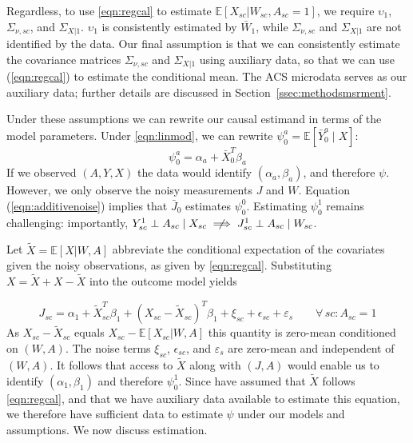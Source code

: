 \documentclass[aoas]{imsart}
\theoremstyle{plain}
\theoremstyle{remark}
\begin{document}
Regardless, to use \eqref{eqn:regcal} to estimate $\mathbb{E}[X_{sc}|W_{sc}, A_{sc}=1]$, we require $\upsilon_1$, $\Sigma_{\nu,sc}$, and $\Sigma_{X|1}$. $\upsilon_1$ is consistently estimated by $\bar{W}_1$, while $\Sigma_{\nu,sc}$ and $\Sigma_{X|1}$ are not identified by the data. Our final assumption is that we can consistently estimate the covariance matrices $\Sigma_{\nu,sc}$ and $\Sigma_{X|1}$ using auxiliary data, so that we can use (\ref{eqn:regcal}) to estimate the conditional mean. The ACS microdata serves as our auxiliary data; further details are discussed in Section~\ref{ssec:methodsmsrment}.

Under these assumptions we can rewrite our causal estimand in terms of the model parameters. Under \eqref{eqn:linmod}, we can rewrite $\psi_0^a = \mathbb{E}[\bar{Y}_0^a \mid X]$:
\begin{equation}\label{eqn:outcome}
\psi_0^a = \alpha_a + \bar{X}_0^T\beta_a
\end{equation}
If we observed $(A, Y, X)$ the data would identify $(\alpha_a, \beta_a)$, and therefore $\psi$. However, we only observe the noisy measurements $J$ and $W$. Equation (\ref{eqn:additivenoise}) implies that $\bar{J}_0$ estimates $\psi_0^0$. Estimating $\psi_0^1$ remains challenging: importantly, $Y_{sc}^1 \perp A_{sc} \mid X_{sc} \centernot\implies J_{sc}^1 \perp A_{sc} \mid W_{sc}$. 

Let $\tilde{X} = \mathbb{E}[X |W, A]$ abbreviate the conditional expectation of the covariates given the noisy observations, as given by \eqref{eqn:regcal}. Substituting $X = \tilde{X} + X - \tilde{X}$ into the outcome model yields

\begin{equation} \label{eqn:JXtilde}
    J_{sc} = \alpha_1 + \tilde{X}_{sc}^T\beta_1 + (X_{sc} - \tilde{X}_{sc})^T\beta_1 + \xi_{sc} + \epsilon_{sc} + \varepsilon_s \qquad\forall\, sc: A_{sc} = 1
\end{equation}
As $X_{sc} - \tilde{X}_{sc}$ equals $X_{sc} - \mathbb{E}[X_{sc}|W,A]$ this quantity is zero-mean conditioned on $(W,A)$. The noise terms $\xi_{sc}$, $\epsilon_{sc}$, and $\varepsilon_s$ are zero-mean and independent of $(W, A)$. It follows that access to $\tilde{X}$ along with $(J,A)$  would enable us to identify $(\alpha_1, \beta_1)$ and therefore $\psi_0^1$. Since have assumed that $\tilde{X}$ follows \eqref{eqn:regcal}, and that we have auxiliary data available to estimate this equation, we therefore have sufficient data to estimate $\psi$ under our models and assumptions. We now discuss estimation.
\end{document}

